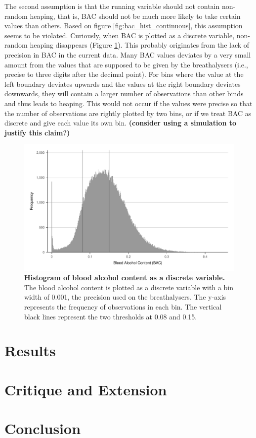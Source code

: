 \documentclass[
  11pt,
]{article}
\begin{document}
The second assumption is that the running variable should not contain
non-random heaping, that is, BAC should not be much more likely to take
certain values than others. Based on figure
\ref{fig:bac_hist_continuous}, this assumption seems to be violated.
Curiously, when BAC is plotted as a discrete variable, non-random
heaping disappears (Figure \ref{fig:bac_hist_discrete}). This probably
originates from the lack of precision in BAC in the current data. Many
BAC values deviates by a very small amount from the values that are
supposed to be given by the breathalysers (i.e., precise to three digits
after the decimal point). For bins where the value at the left boundary
deviates upwards and the values at the right boundary deviates
downwards, they will contain a larger number of observations than other
binds and thus leads to heaping. This would not occur if the values were
precise so that the number of observations are rightly plotted by two
bins, or if we treat BAC as discrete and give each value its own bin.
\textbf{(consider using a simulation to justify this claim?)}

\begin{figure}[h]
  \centering
  \includegraphics[width=0.9\columnwidth]{../figures/bac_histogram_discrete.pdf}
  \caption{\textbf{Histogram of blood alcohol content as a discrete variable.} The blood alcohol content is plotted as a discrete variable with a bin width of 0.001, the precision used on the breathalysers. The y-axis represents the frequency of observations in each bin. The vertical black lines represent the two thresholds at 0.08 and 0.15.}
  \label{fig:bac_hist_discrete}
\end{figure}

\hypertarget{results}{%
\section{Results}\label{results}}

\hypertarget{critique-and-extension}{%
\section{Critique and Extension}\label{critique-and-extension}}

\hypertarget{conclusion}{%
\section{Conclusion}\label{conclusion}}
\end{document}
